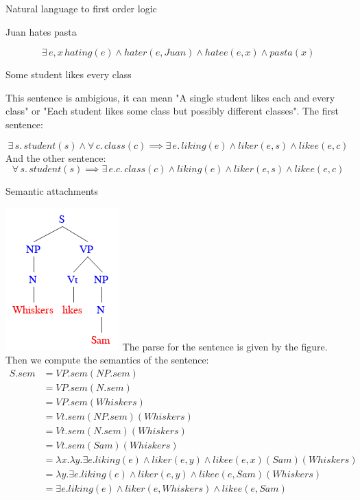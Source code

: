 \documentclass[12pt]{article}
\newenvironment{question}[2][Question]{\begin{trivlist}
\item[\hskip \labelsep {\bfseries #1}\hskip \labelsep {\bfseries #2.}]}{\end{trivlist}}
\newenvironment{answer}[2][Answer]{\begin{trivlist}
\item[\hskip \labelsep {\bfseries #1}\hskip \labelsep {\bfseries #2:}]}{\end{trivlist}}
\begin{document}
\begin{question}{4}
Natural language to first order logic
\end{question}

\begin{answer}{a)}{Juan hates pasta}

$$\exists\, e,x \, hating(e) \land hater(e, Juan) \land hatee(e, x) \land pasta(x) $$
\end{answer}
\begin{answer}{b)}{Some student likes every class}

This sentence is ambigious, it can mean "A single student likes each and every class" or "Each student likes some class but possibly different classes". The first sentence:

$$\exists \, s. \, student(s) \land \forall \, c. \, class(c) \implies \exists \, e. \, liking(e) \land liker(e,s) \land likee(e,c)$$
And the other sentence:
$$\forall \, s. \, student(s) \implies \exists \,e.c. \, class(c) \land liking(e) \land liker(e,s) \land likee(e,c)$$
\end{answer}

\begin{question}{5}
Semantic attachments
\end{question}
\begin{answer}{a)}{}

\includegraphics[scale=0.5]{sem_parse_grapg}
The parse for the sentence is given by the figure. Then we compute the semantics of the sentence:
\begin{align*}
S.sem &=VP.sem(NP.sem) \\
&=VP.sem(N.sem) \\
&=VP.sem(Whiskers) \\
&=Vt.sem(NP.sem)(Whiskers) \\
&=Vt.sem(N.sem)(Whiskers) \\
&=Vt.sem(Sam)(Whiskers) \\
&=\lambda x.\lambda y. \exists e. liking(e) \land liker(e,y) \land likee(e,x)(Sam)(Whiskers) \\
&=\lambda y. \exists e. liking(e) \land liker(e,y) \land likee(e,Sam)(Whiskers) \\
&=\exists e. liking(e) \land liker(e,Whiskers) \land likee(e,Sam) \\
\end{align*}

\end{answer}
\end{document}
